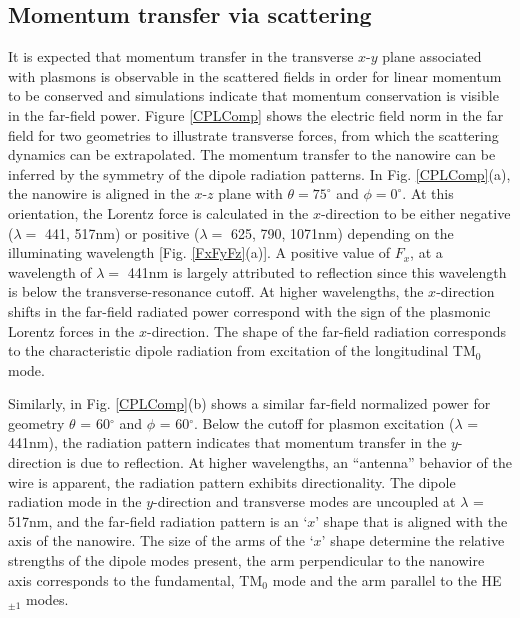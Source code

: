 \subsection{Momentum transfer via scattering}
It is expected that momentum transfer in the transverse $x$-$y$ plane associated with plasmons is observable in the scattered fields in order for linear momentum to be conserved and simulations indicate that momentum conservation is visible in the far-field power.
Figure \ref{CPLComp} shows the electric field norm in the far field for two geometries to illustrate transverse forces, from which the scattering dynamics can be extrapolated. The momentum transfer to the nanowire can be inferred by the symmetry of the dipole  radiation patterns.  In Fig. \ref{CPLComp}(a), the nanowire is aligned in the $x$-$z$ plane with $\theta = 75^\circ$ and $\phi=0^\circ$.  At this orientation, the Lorentz force is calculated in the $x$-direction to be either negative ($\lambda =$ 441, 517nm) or positive ($\lambda =$ 625, 790, 1071nm) depending on the illuminating wavelength [Fig. \ref{FxFyFz}(a)].  A positive value of $F_x$, at a wavelength of $\lambda =$ 441nm is largely attributed to reflection since this wavelength is below the transverse-resonance cutoff.  At higher wavelengths, the $x$-direction shifts in the far-field radiated power correspond with the sign of the plasmonic Lorentz forces in the $x$-direction. The shape of the far-field radiation corresponds to the characteristic dipole radiation from excitation of the longitudinal TM$_0$ mode.

Similarly, in Fig. \ref{CPLComp}(b) shows a similar far-field normalized power for geometry $\theta$ = 60$^\circ$ and $\phi$ = 60$^\circ$.  Below the cutoff for plasmon excitation ($\lambda$ = 441nm), the radiation pattern indicates that momentum transfer in the $y$-direction is due to reflection. At higher wavelengths, an ``antenna'' behavior of the wire is apparent, the radiation pattern exhibits directionality.
 The dipole radiation mode in the $y$-direction and transverse modes are uncoupled at $\lambda$ = 517nm, and the far-field radiation pattern is an `$x$' shape that is aligned with the axis of the nanowire. The size of the arms of the `$x$' shape determine the relative strengths of the dipole modes present, the arm perpendicular to the nanowire axis corresponds to the fundamental, TM$_0$ mode and the arm parallel to the HE$_{\pm1}$ modes.


